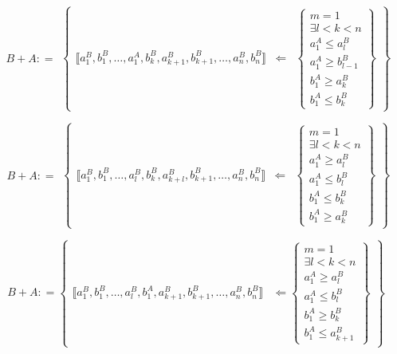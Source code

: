 \documentclass[
]{article}
\begin{document}
\begin{enumerate}
  \[\begin{matrix}
  {{B + A}{: =}}
  \end{matrix}\begin{Bmatrix}
  {⟦{{a_{1}^{B},b_{1}^{B}},\ldots,{a_{1}^{A},b_{k}^{B}},{a_{k + 1}^{B},b_{k + 1}^{B}},\ldots,{a_{n}^{B},b_{n}^{B}}}⟧} & \Leftarrow & \begin{Bmatrix}
  {m = 1} \\
  {\exists{{l < k} < n}} \\
  {a_{1}^{A} \leq a_{l}^{B}} \\
  {a_{1}^{A} \geq b_{l - 1}^{B}} \\
  {b_{1}^{A} \geq a_{k}^{B}} \\
  {b_{1}^{A} \leq b_{k}^{B}}
  \end{Bmatrix}
  \end{Bmatrix}\]

  \[\begin{matrix}
  {{B + A}{: =}}
  \end{matrix}\begin{Bmatrix}
  {⟦{{a_{1}^{B},b_{1}^{B}},\ldots,{a_{l}^{B},b_{k}^{B}},{a_{k + l}^{B},b_{k + 1}^{B}},\ldots,{a_{n}^{B},b_{n}^{B}}}⟧} & \Leftarrow & \begin{Bmatrix}
  {m = 1} \\
  {\exists{{l < k} < n}} \\
  {a_{1}^{A} \geq a_{l}^{B}} \\
  {a_{1}^{A} \leq b_{l}^{B}} \\
  {b_{1}^{A} \leq b_{k}^{B}} \\
  {b_{1}^{A} \geq a_{k}^{B}}
  \end{Bmatrix}
  \end{Bmatrix}\]

  \[{{B + A}{: =}}\begin{Bmatrix}
  {⟦{{a_{1}^{B},b_{1}^{B}},\ldots,{a_{l}^{B},b_{1}^{A}},{a_{k + 1}^{B},b_{k + 1}^{B}},\ldots,{a_{n}^{B},b_{n}^{B}}}⟧} & {\Leftarrow\begin{Bmatrix}
  {m = 1} \\
  {\exists{{l < k} < n}} \\
  {a_{1}^{A} \geq a_{l}^{B}} \\
  {a_{1}^{A} \leq b_{l}^{B}} \\
  {b_{1}^{A} \geq b_{k}^{B}} \\
  {b_{1}^{A} \leq a_{k + 1}^{B}}
  \end{Bmatrix}}
  \end{Bmatrix}\]
\end{enumerate}
\end{document}
